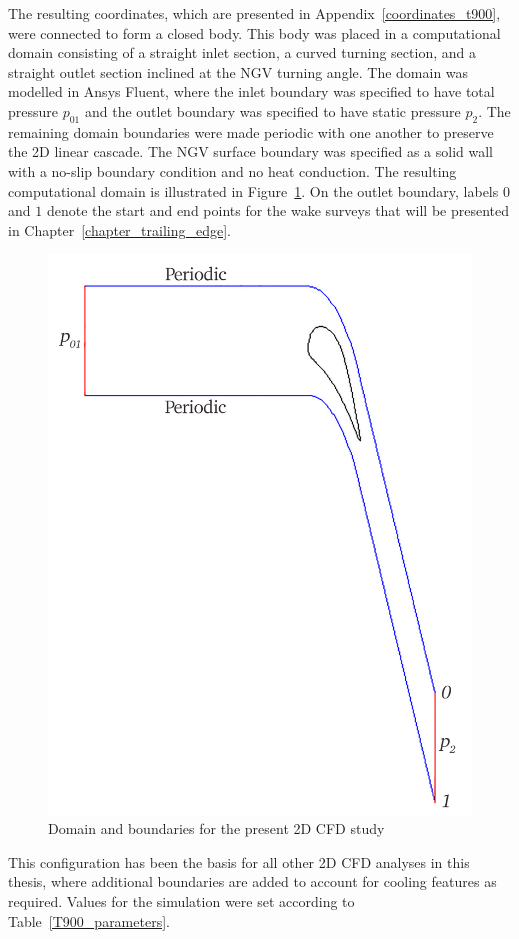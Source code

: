 \documentclass[a4paper, 11pt, oneside]{report}
\begin{document}
The resulting coordinates, which are presented in Appendix~\ref{coordinates_t900}, were connected to form a closed body. This body was placed in a computational domain consisting of a straight inlet section, a curved turning section, and a straight outlet section inclined at the NGV turning angle. The domain was modelled in Ansys Fluent, where the inlet boundary was specified to have total pressure $p_{01}$ and the outlet boundary was specified to have static pressure $p_2$. The remaining domain boundaries were made periodic with one another to preserve the 2D linear cascade. The NGV surface boundary was specified as a solid wall with a no-slip boundary condition and no heat conduction. The resulting computational domain is illustrated in Figure~\ref{fig:computational_domain_and_boundaries}. On the outlet boundary, labels $0$ and $1$ denote the start and end points for the wake surveys that will be presented in Chapter~\ref{chapter_trailing_edge}.

\begin{figure}[H]
	\centering
	\includegraphics[width=.6\textwidth]{figs/domain_boundary_conditions.png}
	\caption{Domain and boundaries for the present 2D CFD study}
	\label{fig:computational_domain_and_boundaries}
\end{figure}

This configuration has been the basis for all other 2D CFD analyses in this thesis, where additional boundaries are added to account for cooling features as required. Values for the simulation were set according to Table~\ref{T900_parameters}.
\end{document}
